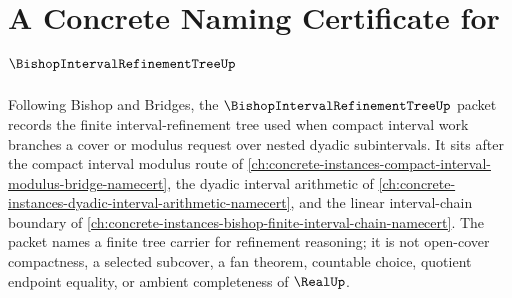 \chapter{A Concrete Naming Certificate for $\BishopIntervalRefinementTreeUp$}
\label{ch:concrete-instances-bishop-interval-refinement-tree-namecert}

Following Bishop and Bridges, the $\BishopIntervalRefinementTreeUp$ packet records the finite interval-refinement tree used when compact interval work branches a cover or modulus request over nested dyadic subintervals. It sits after the compact interval modulus route of \autoref{ch:concrete-instances-compact-interval-modulus-bridge-namecert}, the dyadic interval arithmetic of \autoref{ch:concrete-instances-dyadic-interval-arithmetic-namecert}, and the linear interval-chain boundary of \autoref{ch:concrete-instances-bishop-finite-interval-chain-namecert}. The packet names a finite tree carrier for refinement reasoning; it is not open-cover compactness, a selected subcover, a fan theorem, countable choice, quotient endpoint equality, or ambient completeness of $\RealUp$.

